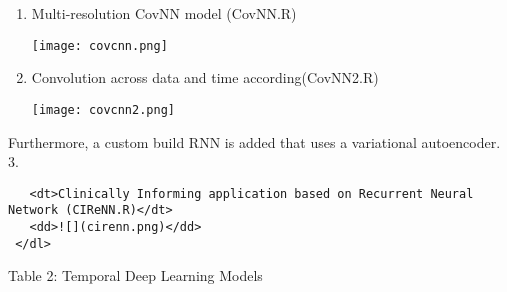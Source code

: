 \documentclass[]{article}
\begin{document}
\begin{enumerate}
\def\labelenumi{\arabic{enumi}.}
\item
  Multi-resolution CovNN model (CovNN.R)

  \texttt{[image: covcnn.png]}
\item
  Convolution across data and time according(CovNN2.R)

  \texttt{[image: covcnn2.png]}

  \newpage
\end{enumerate}

Furthermore, a custom build RNN is added that uses a variational
autoencoder. 3.

\begin{verbatim}
   <dt>Clinically Informing application based on Recurrent Neural Network (CIReNN.R)</dt>
   <dd>![](cirenn.png)</dd>
 </dl>
\end{verbatim}

Table 2: Temporal Deep Learning Models
\end{document}
